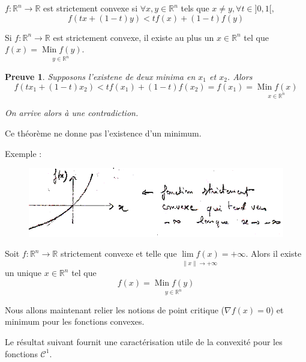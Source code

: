 \documentclass[a4paper,11pt]{article}
\newcommand{\R}{\mathbb{R}}
\newcommand{\norm}[1]{\left\lVert#1\right\rVert}
\newcommand{\deffonc}[3]{#1 : #2 \longrightarrow #3}
\DeclareMathOperator{\Min}{Min}
\theoremstyle{plain} %
\newtheorem{preuve}{Preuve}
\begin{document}
\begin{fdef}
    $\deffonc{f}{\R^n}{\R}$ est strictement convexe si $\forall x,y \in \R^n$ tels
que $x \ne y, \forall t \in ]0,1[,$
    \[
        f(tx + (1-t)y) < tf(x) + (1-t) f(y)
    \]
\end{fdef}

\begin{ftheo}
    Si $\deffonc{f}{\R^n}{\R}$ est strictement convexe, il existe au plus un
    $x \in \R^n$ tel que $f(x) = \underset{y\in \R^n}{\Min f(y)}$.
\end{ftheo}

\begin{preuve}
    Supposons l'existene de deux minima en $x_1$ et $x_2$. Alors 
    \[
        f(tx_1 + (1-t)x_2) < tf(x_1) + (1-t) f(x_2) = f(x_1) = \underset{x \in \R^n}{\Min f(x)}
    \]

    On arrive alors à une contradiction.
\end{preuve}

\begin{remark}
    Ce théorème ne donne pas l'existence d'un minimum.

    Exemple :
\begin{figure}[h]
    \centering
    \includegraphics[scale=0.7]{7optim-min-str-cvx.png}
    \label{fig:7optim-min-str-cvx}
\end{figure}
\end{remark}

\begin{ftheo}
    Soit $\deffonc{f}{\R^n}{\R}$ strictement convexe et telle que $\underset{\norm{x} \longrightarrow +\infty}{\lim f(x)} = +\infty$. Alors il existe un unique $x \in \R^n$ tel que
    \[
        f(x) = \underset{y \in \R^n}{\Min f(y)}
    \]
\end{ftheo}

Nous allons maintenant relier les notions de point critique ($\nabla f(x) = 0$) et minimum
pour les fonctions convexes.

Le résultat suivant fournit une caractérisation utile de la convexité pour les fonctions
$\mathcal{C}^1$.
\end{document}
